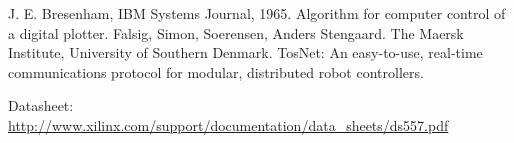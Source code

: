 \begin{thebibliography}{11}

		J. E. Bresenham, IBM Systems Journal, 1965. Algorithm for computer control of a digital plotter.
		Falsig, Simon, Soerensen, Anders Stengaard. The Maersk Institute, University of Southern Denmark. TosNet: An easy-to-use, real-time communications protocol for modular, distributed robot controllers.

	Datasheet: \url{http://www.xilinx.com/support/documentation/data_sheets/ds557.pdf}	
\end{thebibliography}